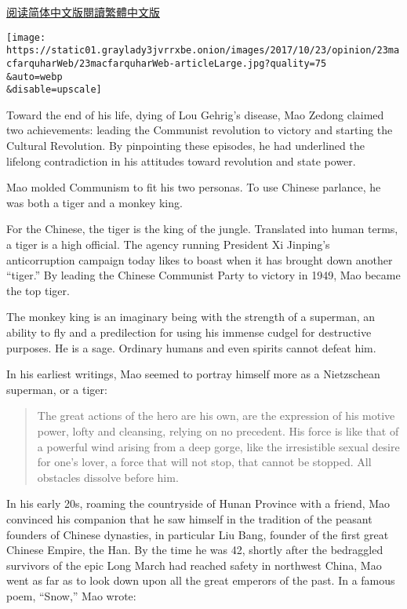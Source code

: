 \href{https://cn.nytimes3xbfgragh.onion/opinion/20171024/how-mao-molded-communism-to-create-a-new-china/}{阅读简体中文版}\href{https://cn.nytimes3xbfgragh.onion/opinion/20171024/how-mao-molded-communism-to-create-a-new-china/zh-hant/}{閱讀繁體中文版}

\texttt{[image: https://static01.graylady3jvrrxbe.onion/images/2017/10/23/opinion/23macfarquharWeb/23macfarquharWeb-articleLarge.jpg?quality=75\\\&auto=webp\\\&disable=upscale]}

Toward the end of his life, dying of Lou Gehrig's disease, Mao Zedong
claimed two achievements: leading the Communist revolution to victory
and starting the Cultural Revolution. By pinpointing these episodes, he
had underlined the lifelong contradiction in his attitudes toward
revolution and state power.

Mao molded Communism to fit his two personas. To use Chinese parlance,
he was both a tiger and a monkey king.

For the Chinese, the tiger is the king of the jungle. Translated into
human terms, a tiger is a high official. The agency running President Xi
Jinping's anticorruption campaign today likes to boast when it has
brought down another ``tiger.'' By leading the Chinese Communist Party
to victory in 1949, Mao became the top tiger.

The monkey king is an imaginary being with the strength of a superman,
an ability to fly and a predilection for using his immense cudgel for
destructive purposes. He is a sage. Ordinary humans and even spirits
cannot defeat him.

In his earliest writings, Mao seemed to portray himself more as a
Nietzschean superman, or a tiger:

\begin{quote}
The great actions of the hero are his own, are the expression of his
motive power, lofty and cleansing, relying on no precedent. His force is
like that of a powerful wind arising from a deep gorge, like the
irresistible sexual desire for one's lover, a force that will not stop,
that cannot be stopped. All obstacles dissolve before him.
\end{quote}

In his early 20s, roaming the countryside of Hunan Province with a
friend, Mao convinced his companion that he saw himself in the tradition
of the peasant founders of Chinese dynasties, in particular Liu Bang,
founder of the first great Chinese Empire, the Han. By the time he was
42, shortly after the bedraggled survivors of the epic Long March had
reached safety in northwest China, Mao went as far as to look down upon
all the great emperors of the past. In a famous poem, ``Snow,'' Mao
wrote:

